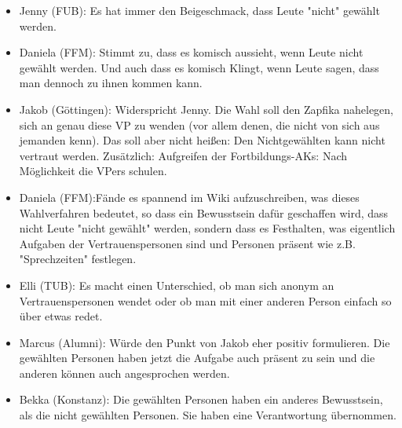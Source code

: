 \begin{itemize}
        \item Jenny (FUB): Es hat immer den Beigeschmack, dass Leute "nicht" gewählt werden.
        \item Daniela (FFM): Stimmt zu, dass es komisch aussieht, wenn Leute nicht gewählt werden. Und auch dass es komisch Klingt, wenn Leute sagen, dass man dennoch zu ihnen kommen kann.
        \item Jakob (Göttingen): Widerspricht Jenny. Die Wahl soll den Zapfika nahelegen, sich an genau diese VP zu wenden (vor allem denen, die nicht von sich aus jemanden kenn). Das soll aber nicht heißen: Den Nichtgewählten kann nicht vertraut werden. Zusätzlich: Aufgreifen der Fortbildungs-AKs: Nach Möglichkeit die VPers schulen.
        \item Daniela (FFM):Fände es spannend im Wiki aufzuschreiben, was dieses Wahlverfahren bedeutet, so dass ein Bewusstsein dafür geschaffen wird, dass nicht Leute "nicht gewählt" werden, sondern dass es Festhalten, was eigentlich Aufgaben der Vertrauenspersonen sind und Personen präsent wie z.B. "Sprechzeiten" festlegen.
        \item Elli (TUB): Es macht einen Unterschied, ob man sich anonym an Vertrauenspersonen wendet oder ob man mit einer anderen Person einfach so über etwas redet.
        \item Marcus (Alumni): Würde den Punkt von Jakob eher positiv formulieren. Die gewählten Personen haben jetzt die Aufgabe auch präsent zu sein und die anderen können auch angesprochen werden.
        \item Bekka (Konstanz): Die gewählten Personen haben ein anderes Bewusstsein, als die nicht gewählten Personen. Sie haben eine Verantwortung übernommen.
      \end{itemize}

